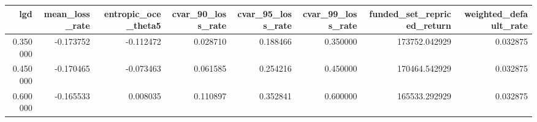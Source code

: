 \begin{tabular}{rrrrrrrr}
\toprule
lgd & mean\_loss\_rate & entropic\_oce\_theta5 & cvar\_90\_loss\_rate & cvar\_95\_loss\_rate & cvar\_99\_loss\_rate & funded\_set\_repriced\_return & weighted\_default\_rate \\
\midrule
0.350000 & -0.173752 & -0.112472 & 0.028710 & 0.188466 & 0.350000 & 173752.042929 & 0.032875 \\
0.450000 & -0.170465 & -0.073463 & 0.061585 & 0.254216 & 0.450000 & 170464.542929 & 0.032875 \\
0.600000 & -0.165533 & 0.008035 & 0.110897 & 0.352841 & 0.600000 & 165533.292929 & 0.032875 \\
\bottomrule
\end{tabular}
